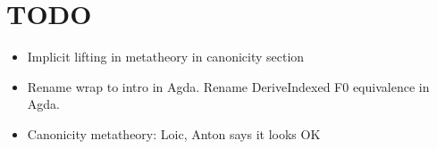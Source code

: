 \documentclass[acmsmall,screen,review,anonymous]{acmart}
\newcommand{\blank}{{\mathord{\hspace{1pt}\text{--}\hspace{1pt}}}}
\newcommand{\w}{\circ}
\begin{document}


\section{TODO}


\begin{itemize}
  \item Implicit lifting in metatheory in canonicity section
  \item Rename wrap to intro in Agda. Rename DeriveIndexed F0 equivalence in Agda.
  \item Canonicity metatheory: Loic, Anton says it looks OK

\end{itemize}



\end{document}
